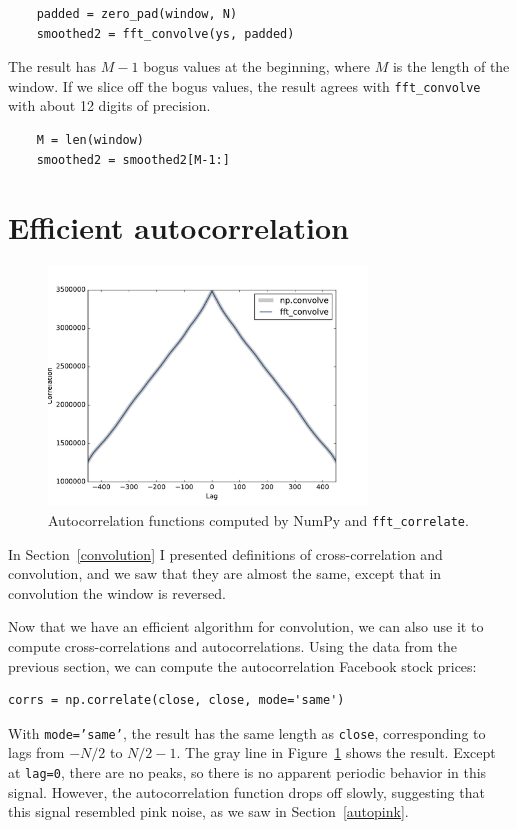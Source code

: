\documentclass[12pt]{book}
\begin{document}
\begin{verbatim}
    padded = zero_pad(window, N)
    smoothed2 = fft_convolve(ys, padded)
\end{verbatim}

The result has $M-1$ bogus values at the beginning, where $M$ is the
length of the window.  If we slice off the bogus values, the result
agrees with \verb"fft_convolve" with about 12 digits of precision.

\begin{verbatim}
    M = len(window)
    smoothed2 = smoothed2[M-1:]
\end{verbatim}


\section{Efficient autocorrelation}

\begin{figure}
\centerline{\includegraphics[height=2.5in]{figs/convolution9.pdf}}
\caption{Autocorrelation functions computed by NumPy and
  {\tt fft\_correlate}.}
\label{fig.convolution9}
\end{figure}

In Section~\ref{convolution} I presented definitions of
cross-correlation and convolution, and we saw that they are
almost the same, except that in convolution the window is
reversed.

Now that we have an efficient algorithm for convolution, we
can also use it to compute cross-correlations and autocorrelations.
Using the data from the previous section, we can compute the
autocorrelation Facebook stock prices:

\begin{verbatim}
corrs = np.correlate(close, close, mode='same')
\end{verbatim}

With {\tt mode='same'}, the result has the same length as {\tt close},
corresponding to lags from $-N/2$ to $N/2-1$.  
The gray line in Figure~\ref{fig.convolution9} shows the result.
Except at {\tt lag=0}, there are no peaks, so there is no apparent
periodic behavior in this signal.  However, the autocorrelation
function drops off slowly, suggesting that this signal resembled
pink noise, as we saw in Section~\ref{autopink}.
\end{document}
